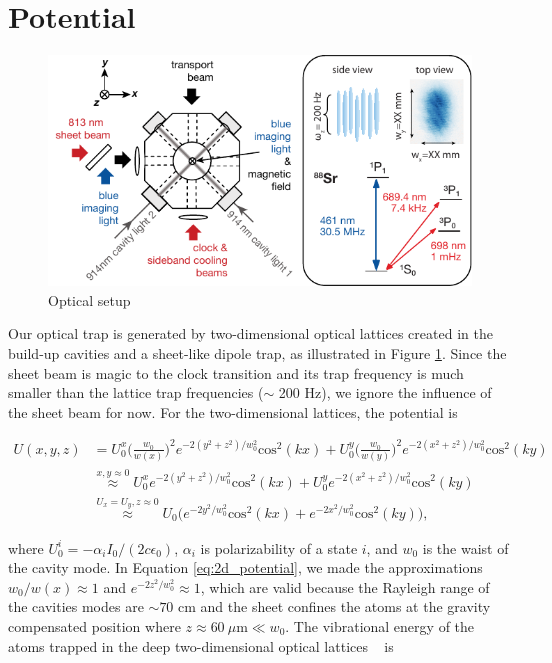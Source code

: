 \section{Potential}
\label{sec:potential}

	\begin{figure}[h]
	    \centering
	    \includegraphics[]{figures/setup.pdf}
	    \caption{Optical setup}
	    \label{fig:setup}
	\end{figure}

	Our optical trap is generated by two-dimensional optical lattices created in the build-up cavities and a sheet-like dipole trap, as illustrated in Figure \ref{fig:setup}. Since the sheet beam is magic to the clock transition and its trap frequency is much smaller than the lattice trap frequencies ($\sim$ 200 Hz), we ignore the influence of the sheet beam for now. For the two-dimensional lattices, the potential is

	\begin{align}
	U(x,y,z)&=U^{x}_{0}\bigg(\frac{w_{0}}{w(x)}\bigg)^{2}e^{-2(y^{2}+z^{2})/w^{2}_{0}}\text{cos}^{2}(kx)+U^{y}_{0}\bigg(\frac{w_{0}}{w(y)}\bigg)^{2}e^{-2(x^{2}+z^{2})/w^{2}_{0}}\text{cos}^{2}(ky) \nonumber \\
	&\stackrel{x,y \approx 0}{\approx} U^{x}_{0}e^{-2(y^{2}+z^{2})/w^{2}_{0}}\text{cos}^{2}(kx)+U^{y}_{0}e^{-2(x^{2}+z^{2})/w^{2}_{0}}\text{cos}^{2}(ky) \nonumber\\
	&\stackrel{U_{x}=U_{y}, z\approx{0}}{\approx} U_{0}\bigg(e^{-2y^{2}/w^{2}_{0}}\text{cos}^{2}(kx)+e^{-2x^{2}/w^{2}_{0}}\text{cos}^{2}(ky)\bigg),
	\label{eq:2d_potential}
	\end{align}

	\noindent where $U^{i}_{0} = - \alpha_{i} I_{0} / (2c\epsilon_{0})$, $\alpha_{i}$ is polarizability of a state $i$, and $w_{0}$ is the waist of the cavity mode. In Equation \ref{eq:2d_potential}, we made the approximations $w_{0}/w(x)\approx1$ and $e^{-2z^{2}/w^{2}_{0}}\approx 1$, which are valid because the Rayleigh range of the cavities modes are $\sim 70$ cm and the sheet confines the atoms at the gravity compensated position where $z\approx 60 \ \mu \text{m} \ll  w_{0}$. The vibrational energy of the atoms trapped in the deep two-dimensional optical lattices ~\cite{blatt09} is

